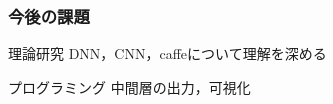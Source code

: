 \documentclass[dvipdfmx,11pt,notheorems]{beamer}
\theoremstyle{definition}
\newtheorem{theorem}{定理}
\begin{document}
\begin{frame}\frametitle{今後の課題}

\begin{block}{理論研究}
DNN，CNN，caffeについて理解を深める
\end{block}

\vspace{1cm}
\begin{exampleblock}{プログラミング}
中間層の出力，可視化
\end{exampleblock}
\end{frame}




\end{document}
